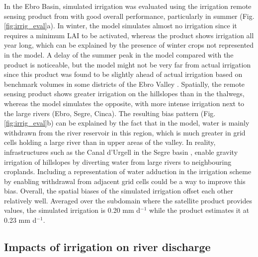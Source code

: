In the Ebro Basin, simulated irrigation was evaluated using the irrigation remote sensing product from \cite{dari_regional_2023} with good overall performance, particularly in summer (Fig. \ref{fig:irrig_eval}a).
In winter, the model simulates almost no irrigation since it requires a minimum LAI to be activated, whereas the product shows irrigation all year long, which can be explained by the presence of winter crops not represented in the model.
A delay of the summer peak in the model compared with the product is noticeable, but the model might not be very far from actual irrigation since this product was found to be slightly ahead of actual irrigation based on benchmark volumes in some districts of the Ebro Valley \citep[Fig. 5 in ][]{dari_regional_2023}.
Spatially, the remote sensing product shows greater irrigation on the hillslopes than in the thalwegs, whereas the model simulates the opposite, with more intense irrigation next to the large rivers (Ebro, Segre, Cinca).
The resulting bias pattern (Fig. \ref{fig:irrig_eval}b) can be explained by the fact that in the model, water is mainly withdrawn from the river reservoir in this region, which is much greater in grid cells holding a large river than in upper areas of the valley. In reality, infrastructures such as the Canal d'Urgell in the Segre basin \citep{farran_urgell_2024}, enable gravity irrigation of hillslopes by diverting water from large rivers to neighbouring croplands. Including a representation of water adduction in the irrigation scheme by enabling withdrawal from adjacent grid cells could be a way to improve this bias.
Overall, the spatial biases of the simulated irrigation offset each other relatively well. Averaged over the subdomain where the satellite product provides values, the simulated irrigation is 0.20 mm d$^{-1}$ while the product estimates it at 0.23 mm d$^{-1}$.

\subsection{Impacts of irrigation on river discharge}

